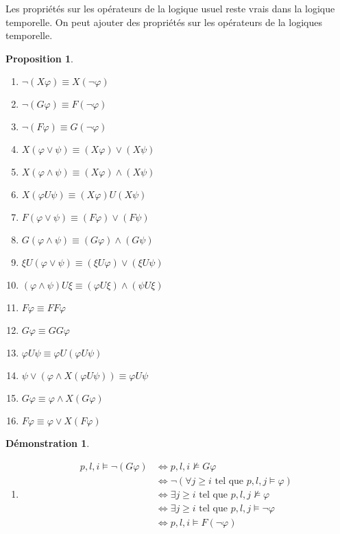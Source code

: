 \documentclass[12pt,a4paper]{article}
\theoremstyle{plain}
\newtheorem{prop}{Proposition}
\newtheorem{dem}{Démonstration}
\theoremstyle{definition}
\begin{document}
Les propriétés sur les opérateurs de la logique usuel reste vrais dans la logique temporelle. On peut ajouter des propriétés sur les opérateurs de la logiques temporelle.
\begin{prop} 
	\leavevmode \newline
	\begin{enumerate}
		\item $\lnot (X \varphi) \equiv X(\lnot \varphi)$
		\item $\lnot (G \varphi) \equiv F(\lnot \varphi)$
		\item $\lnot (F \varphi) \equiv G(\lnot \varphi)$
		
		\item $X (\varphi \lor \psi) \equiv (X \varphi) \lor (X \psi)$
		\item $X (\varphi \land \psi) \equiv (X \varphi) \land (X \psi)$
		\item $X (\varphi U \psi) \equiv (X \varphi) U (X \psi)$
		\item $F (\varphi \lor \psi) \equiv (F \varphi) \lor (F \psi)$
		\item $G (\varphi \land \psi) \equiv (G \varphi) \land (G \psi)$
		\item $\xi U (\varphi \lor \psi) \equiv (\xi U \varphi) \lor (\xi U \psi)$
		\item $(\varphi \land \psi) U \xi \equiv (\varphi U \xi) \land (\psi U \xi)$
		
		\item $F \varphi \equiv FF\varphi$
		\item $G \varphi \equiv GG\varphi$
		\item $\varphi U \psi \equiv \varphi U (\varphi U \psi)$
		\item $\psi \lor (\varphi \land X(\varphi U \psi)) \equiv \varphi U \psi$
		\item $G \varphi \equiv \varphi \land X(G \varphi)$
		\item $F \varphi \equiv \varphi \lor X(F\varphi)$
	\end{enumerate}
\end{prop}

\begin{dem}
	\leavevmode \newline
	\begin{enumerate}
		\item[2.] 
		\begin{align*}
			 p,l,i \models \lnot (G \varphi) &\Leftrightarrow p,l,i \not \models G \varphi \\
			 &\Leftrightarrow \lnot (\forall j \geq i\textrm{ tel que } p,l,j \models \varphi) \\
			 &\Leftrightarrow \exists j \geq i \textrm{ tel que } p,l,j \not \models \varphi \\
			 &\Leftrightarrow \exists j \geq i \textrm{ tel que } p,l,j \models \lnot \varphi \\
			 &\Leftrightarrow p,l,i \models F (\lnot \varphi)
		\end{align*}
	\end{enumerate}
\end{dem}
\end{document}
